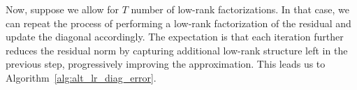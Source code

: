 \documentclass[final,hidelinks,onefignum,onetabnum]{siamart250211}
\providecommand{\1}{\mathbf{1}}
\theoremstyle{plain}
\begin{document}

Now, suppose we allow for $T$ number of low-rank factorizations. In that case, we can repeat the process of performing a low-rank factorization of the residual and update the diagonal accordingly. The expectation is that each iteration further reduces the residual norm by capturing additional low-rank structure left in the previous step, progressively improving the approximation. This leads us to Algorithm~\ref{alg:alt_lr_diag_error}.
\end{document}
